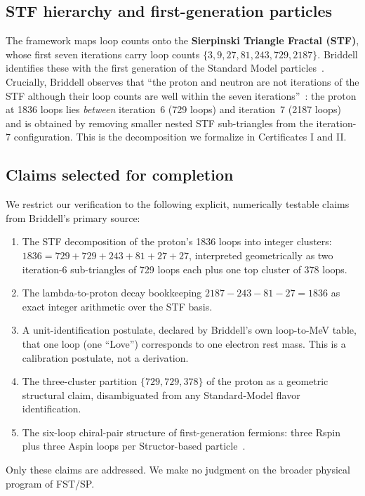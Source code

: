 \documentclass[12pt,a4paper]{article}
\begin{document}
\subsection{STF hierarchy and first-generation particles}

The framework maps loop counts onto the \textbf{Sierpinski Triangle
Fractal (STF)}, whose first seven iterations carry loop counts
$\{3, 9, 27, 81, 243, 729, 2187\}$. Briddell identifies these with the
first generation of the Standard Model
particles~\cite[Chap.~15]{briddellbook2020}. Crucially, Briddell observes
that ``the proton and neutron are not iterations of the STF although
their loop counts are well within the seven
iterations''~\cite[line 861]{briddellbook2020}: the proton at 1836 loops
lies \emph{between} iteration~6 (729 loops) and iteration~7 (2187 loops)
and is obtained by removing smaller nested STF sub-triangles from the
iteration-7 configuration. This is the decomposition we formalize in
Certificates I and II.

\subsection{Claims selected for completion}

We restrict our verification to the following explicit, numerically
testable claims from Briddell's primary source:
\begin{enumerate}[nosep]
  \item The STF decomposition of the proton's 1836 loops into integer
        clusters: $1836 = 729 + 729 + 243 + 81 + 27 + 27$, interpreted
        geometrically as two iteration-6 sub-triangles of 729 loops
        each plus one top cluster of 378 loops.
  \item The lambda-to-proton decay bookkeeping
        $2187 - 243 - 81 - 27 = 1836$ as exact integer arithmetic
        over the STF basis.
  \item A unit-identification postulate, declared by Briddell's own
        loop-to-MeV table, that one loop (one ``Love'') corresponds to
        one electron rest mass. This is a calibration postulate, not
        a derivation.
  \item The three-cluster partition $\{729, 729, 378\}$ of the proton
        as a geometric structural claim, disambiguated from any
        Standard-Model flavor identification.
  \item The six-loop chiral-pair structure of first-generation
        fermions: three Rspin plus three Aspin loops per Structor-based
        particle~\cite[line 795]{briddellbook2020}.
\end{enumerate}
Only these claims are addressed. We make no judgment on the broader
physical program of FST/SP.
\end{document}

